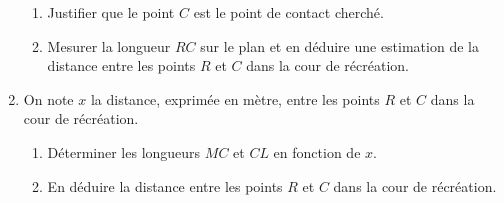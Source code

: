 \begin{exercice}
\begin{enumerate}
\begin{enumerate}
         \item Justifier que le point $C$ est le point de contact cherché.
         \item Mesurer la longueur $RC$ sur le plan et en déduire une estimation de la distance entre les points $R$ et $C$ dans la cour de récréation.
      \end{enumerate}
      \item On note $x$ la distance, exprimée en mètre, entre les points $R$ et $C$ dans la cour de récréation.
      \begin{enumerate}
         \item Déterminer les longueurs $MC$ et $CL$ en fonction de $x$.
         \item En déduire la distance entre les points $R$ et $C$ dans la cour de récréation.
      \end{enumerate}
   \end{enumerate}
\end{exercice}

